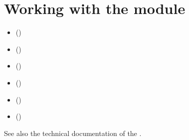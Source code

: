 \documentclass[a4paper,10pt,english]{sphinxhowto}
\begin{document}
\section{Working with the  module}
\label{\detokenize{tutorial:working-with-the-graphs-module}}\label{\detokenize{tutorial:graphs-tutorial-label}}
\begin{sphinxShadowBox}
\begin{itemize}
\item {} 
\label{\detokenize{tutorial:id219}}{\hyperref[\detokenize{tutorial:structure-of-a-graph-object}]{}} ()

\item {} 
\label{\detokenize{tutorial:id220}}{\hyperref[\detokenize{tutorial:q-coloring-of-a-graph}]{}} ()

\item {} 
\label{\detokenize{tutorial:id221}}{\hyperref[\detokenize{tutorial:mis-and-clique-enumeration}]{}} ()

\item {} 
\label{\detokenize{tutorial:id222}}{\hyperref[\detokenize{tutorial:line-graphs-and-maximal-matchings}]{}} ()

\item {} 
\label{\detokenize{tutorial:id223}}{\hyperref[\detokenize{tutorial:grids-and-the-ising-model}]{}} ()

\item {} 
\label{\detokenize{tutorial:id224}}{\hyperref[\detokenize{tutorial:simulating-metropolis-random-walks}]{}} ()

\end{itemize}
\end{sphinxShadowBox}

See also the technical documentation of the .
\end{document}
